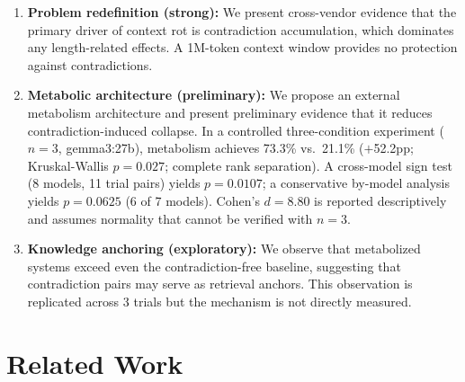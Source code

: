 \documentclass[11pt,a4paper]{article}
\begin{document}
\begin{enumerate}\item \textbf{Problem redefinition (strong):} We present cross-vendor evidence that the primary driver of context rot is contradiction accumulation, which dominates any length-related effects. A 1M-token context window provides no protection against contradictions.
\item \textbf{Metabolic architecture (preliminary):} We propose an external metabolism architecture and present preliminary evidence that it reduces contradiction-induced collapse. In a controlled three-condition experiment ($n = 3$, gemma3:27b), metabolism achieves 73.3\% vs.\ 21.1\% ($+$52.2pp; Kruskal-Wallis $p = 0.027$; complete rank separation). A cross-model sign test (8 models, 11 trial pairs) yields $p = 0.0107$; a conservative by-model analysis yields $p = 0.0625$ (6 of 7 models). Cohen's $d = 8.80$ is reported descriptively and assumes normality that cannot be verified with $n = 3$.
\item \textbf{Knowledge anchoring (exploratory):} We observe that metabolized systems exceed even the contradiction-free baseline, suggesting that contradiction pairs may serve as retrieval anchors. This observation is replicated across 3 trials but the mechanism is not directly measured.
\end{enumerate}

\section{Related Work}
\label{sec:related}
\end{document}

